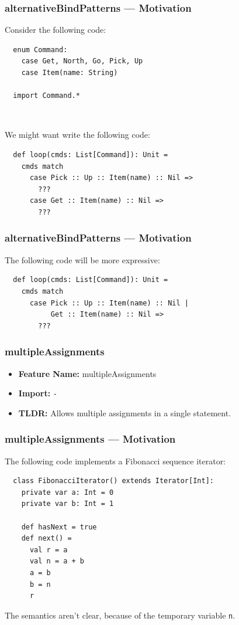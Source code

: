 \documentclass{beamer}
\begin{document}
\begin{frame}[fragile]
  \frametitle{alternativeBindPatterns --- Motivation}

  Consider the following code:

  \begin{lstlisting}
  enum Command:
    case Get, North, Go, Pick, Up
    case Item(name: String)
  
  import Command.*
  \end{lstlisting}

  \pause\

  We might want write the following code:

  \begin{lstlisting}
  def loop(cmds: List[Command]): Unit =
    cmds match
      case Pick :: Up :: Item(name) :: Nil =>
        ???
      case Get :: Item(name) :: Nil =>
        ???
  \end{lstlisting}
\end{frame}

\begin{frame}[fragile]
  \frametitle{alternativeBindPatterns --- Motivation}

  The following code will be more expressive:

  \begin{lstlisting}
  def loop(cmds: List[Command]): Unit =
    cmds match
      case Pick :: Up :: Item(name) :: Nil |
           Get :: Item(name) :: Nil =>
        ???
  \end{lstlisting}

\end{frame}

\begin{frame}[fragile]
  \frametitle{multipleAssignments}
  \begin{itemize}
    \item \textbf{Feature Name:} multipleAssignments
    \item \textbf{Import:} \texttt{-}
    \item \textbf{TLDR:} Allows multiple assignments in a single statement.
  \end{itemize}
\end{frame}

\begin{frame}[fragile]
  \frametitle{multipleAssignments --- Motivation}

  The following code implements a Fibonacci sequence iterator:

  \begin{lstlisting}
  class FibonacciIterator() extends Iterator[Int]:
    private var a: Int = 0
    private var b: Int = 1
  
    def hasNext = true
    def next() =
      val r = a
      val n = a + b
      a = b
      b = n
      r
  \end{lstlisting}

  The semantics aren't clear, because of the temporary variable \texttt{n}.
\end{frame}
\end{document}
